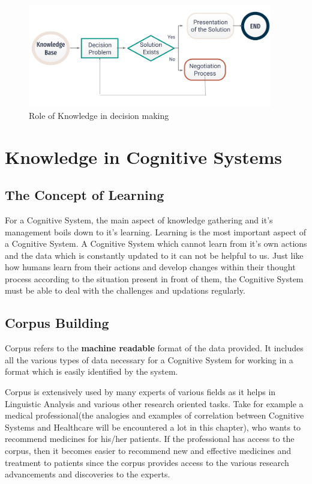 \begin{figure}[h!]
	\begin{center}
		\includegraphics[width=0.95\textwidth]{./images/decision.png}
	\end{center}
	\caption{Role of Knowledge in decision making}\label{fig:decision}
\end{figure}

\chapter{Knowledge in Cognitive Systems}\label{Knowledge in Cognitive Systems}

\section{The Concept of Learning}\label{The Concept of Learning}
For a Cognitive System, the main aspect of knowledge gathering and it's
management boils down to it's learning. Learning is the most important aspect
of a Cognitive System. A Cognitive System which cannot learn from it's own
actions and the data which is constantly updated to it can not be helpful to
us. Just like how humans learn from their actions and develop changes within
their thought process according to the situation present in front of them, the
Cognitive System must be able to deal with the challenges and updations
regularly.

\section{Corpus Building}\label{Corpus Building}
Corpus refers to the \textbf{machine readable} format of the data provided. It
includes all the various types of data necessary for a Cognitive System for
working in a format which is easily identified by the system.

Corpus is extensively used by many experts of various fields as it helps in
Linguistic Analysis and various other research oriented tasks. Take for example
a medical professional(the analogies and examples of correlation between
Cognitive Systems and Healthcare will be encountered a lot in this chapter),
who wants to recommend medicines for his/her patients. If the professional has
access to the corpus, then it becomes easier to recommend new and effective
medicines and treatment to patients since the corpus provides access to the
various research advancements and discoveries to the experts.

